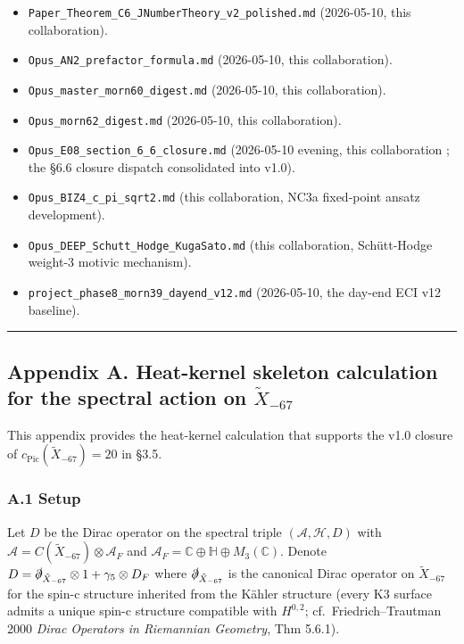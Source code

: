 \documentclass[
  11pt,
  a4paper,
]{article}
\begin{document}
\begin{itemize}
\item
  \texttt{Paper\_Theorem\_C6\_JNumberTheory\_v2\_polished.md} (2026-05-10, this collaboration).
\item
  \texttt{Opus\_AN2\_prefactor\_formula.md} (2026-05-10, this collaboration).
\item
  \texttt{Opus\_master\_morn60\_digest.md} (2026-05-10, this collaboration).
\item
  \texttt{Opus\_morn62\_digest.md} (2026-05-10, this collaboration).
\item
  \texttt{Opus\_E08\_section\_6\_6\_closure.md} (2026-05-10 evening, this collaboration ; the §6.6 closure dispatch consolidated into v1.0).
\item
  \texttt{Opus\_BIZ4\_c\_pi\_sqrt2.md} (this collaboration, NC3a fixed-point ansatz development).
\item
  \texttt{Opus\_DEEP\_Schutt\_Hodge\_KugaSato.md} (this collaboration, Schütt-Hodge weight-3 motivic mechanism).
\item
  \texttt{project\_phase8\_morn39\_dayend\_v12.md} (2026-05-10, the day-end ECI v12 baseline).
\end{itemize}

\begin{center}\rule{0.5\linewidth}{0.5pt}\end{center}

\hypertarget{appendix-a.-heat-kernel-skeleton-calculation-for-the-spectral-action-on-tilde-x_-67}{%
\subsection{\texorpdfstring{Appendix A. Heat-kernel skeleton calculation for the spectral action on \(\tilde X_{-67}\)}{Appendix A. Heat-kernel skeleton calculation for the spectral action on \textbackslash tilde X\_\{-67\}}}\label{appendix-a.-heat-kernel-skeleton-calculation-for-the-spectral-action-on-tilde-x_-67}}

This appendix provides the heat-kernel calculation that supports the v1.0 closure of \(c_{\mathrm{Pic}}(\tilde X_{-67}) = 20\) in §3.5.

\hypertarget{a.1-setup}{%
\subsubsection{A.1 Setup}\label{a.1-setup}}

Let \(D\) be the Dirac operator on the spectral triple \((\mathcal A, \mathcal H, D)\) with \(\mathcal A = C(\tilde X_{-67}) \otimes \mathcal A_F\) and \(\mathcal A_F = \mathbb C \oplus \mathbb H \oplus M_3(\mathbb C)\). Denote \(D = \slashed{\partial}_{\tilde X_{-67}} \otimes 1 + \gamma_5 \otimes D_F\) where \(\slashed{\partial}_{\tilde X_{-67}}\) is the canonical Dirac operator on \(\tilde X_{-67}\) for the spin-c structure inherited from the Kähler structure (every K3 surface admits a unique spin-c structure compatible with \(H^{0,2}\); cf.~Friedrich--Trautman 2000 \emph{Dirac Operators in Riemannian Geometry}, Thm 5.6.1).
\end{document}
